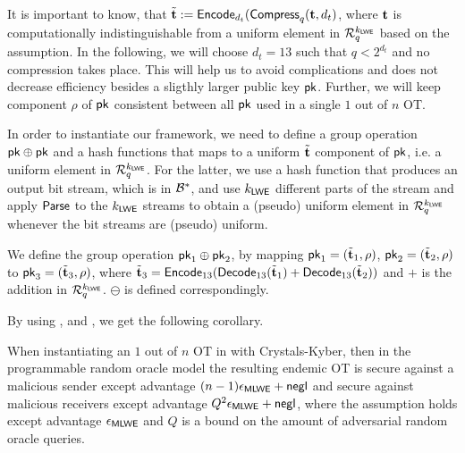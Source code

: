 It is important to know, that $\tilde{{\mathbf t}}:=\mathsf{Encode}_{d_t}(\mathsf{Compress}_q({\mathbf t}, d_t)$, where ${\mathbf t}$ is computationally indistinguishable from a uniform element in $\mathcal R_q^{k_{\mathsf{LWE}}}$ based on the \MLWE assumption. In the following, we will choose $d_t=13$ such that $q<2^{d_t}$ and no compression takes place. This will help us to avoid complications and does not decrease efficiency besides a sligthly larger public key $\mathsf{pk}$. Further, we will keep component $\rho$ of $\mathsf{pk}$ consistent between all $\mathsf{pk}$ used in a single $1$ out of $n$ OT.

In order to instantiate our framework, we need to define a group operation $\mathsf{pk}\oplus\mathsf{pk}$ and a hash functions that maps to a uniform $\tilde{{\mathbf t}}$ component of $\mathsf{pk}$, i.e. a uniform element in $\mathcal R_q^{k_{\mathsf{LWE}}}$. For the latter, we use a hash function that produces an output bit stream, which is in $\mathcal{B}^{*}$, and use $k_{\mathsf{LWE}}$ different parts of the stream and apply $\mathsf{Parse}$ to the $k_{\mathsf{LWE}}$ streams to obtain a (pseudo) uniform element in $\mathcal R_q^{k_{\mathsf{LWE}}}$ whenever the bit streams are (pseudo) uniform.

We define the group operation $\mathsf{pk}_1\oplus\mathsf{pk}_2$, by mapping $\mathsf{pk}_1=(\tilde{{\mathbf t}}_1,\rho)$, $\mathsf{pk}_2=(\tilde{{\mathbf t}}_2,\rho)$ to $\mathsf{pk}_3=(\tilde{{\mathbf t}}_3, \rho)$, where $\tilde{{\mathbf t}}_3=\mathsf{Encode}_{13}(\mathsf{Decode}_{13}(\tilde{{\mathbf t}}_1)+\mathsf{Decode}_{13}(\tilde{{\mathbf t}}_2))$ and $+$ is the addition in $\mathcal R_q^{k_{\mathsf{LWE}}}$. $\ominus$ is defined correspondingly. 

By using ,  and , we get the following corollary.
 
\begin{corollary}
When instantiating an $1$ out of $n$ OT in  with Crystals-Kyber, then in the programmable random oracle model the resulting endemic OT is secure against a malicious sender except advantage $(n-1)\epsilon_{\mathsf{MLWE}}+\mathsf{negl}$  and secure against malicious receivers except advantage $Q^2\epsilon_{\mathsf{MLWE}}+\mathsf{negl}$, where the \MLWE assumption holds except advantage $\epsilon_{\mathsf{MLWE}}$ and $Q$ is a bound on the amount of adversarial random oracle queries.
\end{corollary}